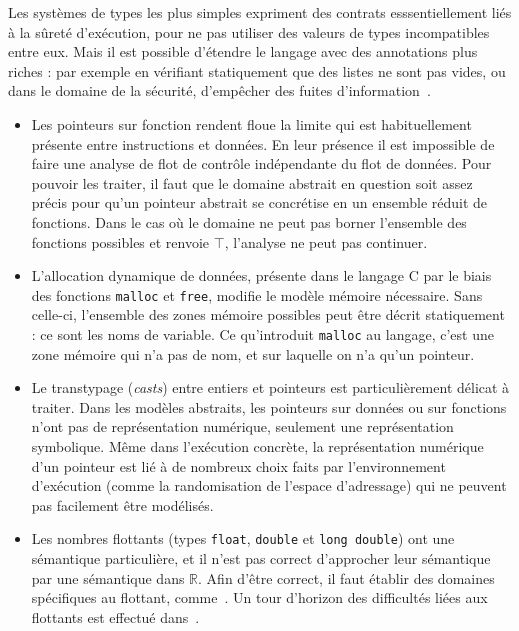 

Les systèmes de types les plus simples expriment des
contrats esssentiellement liés à la sûreté d'exécution, pour ne pas utiliser des
valeurs de types incompatibles entre eux. Mais il est possible d'étendre le
langage avec des annotations plus riches : par exemple en vérifiant statiquement
que des listes ne sont pas vides\cite{lightweight-static-capabilities}, ou dans
le domaine de la sécurité, d'empêcher des fuites d'information~\cite{LZ06a}.



\begin{itemize}
\item
Les pointeurs sur fonction rendent floue la limite qui est habituellement
présente entre instructions et données. En leur présence il est impossible de
faire une analyse de flot de contrôle indépendante du flot de données. Pour
pouvoir les traiter, il faut que le domaine abstrait en question soit assez
précis pour qu'un pointeur abstrait se concrétise en un ensemble réduit de
fonctions. Dans le cas où le domaine ne peut pas borner l'ensemble des fonctions
possibles et renvoie $\top$, l'analyse ne peut pas continuer.

\item
L'allocation dynamique de données, présente dans le langage C par le biais des
fonctions \texttt{malloc} et \texttt{free}, modifie le modèle mémoire
nécessaire. Sans celle-ci, l'ensemble des zones mémoire possibles peut être
décrit statiquement : ce sont les noms de variable. Ce qu'introduit
\texttt{malloc} au langage, c'est une zone mémoire qui n'a pas de nom, et sur
laquelle on n'a qu'un pointeur.


\item
Le transtypage (\emph{casts}) entre entiers et pointeurs est particulièrement
délicat à traiter. Dans les modèles abstraits, les pointeurs sur données ou sur
fonctions n'ont pas de représentation numérique, seulement une représentation
symbolique. Même dans l'exécution concrète, la représentation numérique d'un
pointeur est lié à de nombreux choix faits par l'environnement d'exécution
(comme la randomisation de l'espace d'adressage) qui ne peuvent pas facilement
être modélisés.

\item
Les nombres flottants (types \texttt{float}, \texttt{double} et \texttt{long
double}) ont une sémantique particulière, et il n'est pas correct d'approcher
leur sémantique par une sémantique dans $ℝ$. Afin d'être correct, il faut
établir des domaines spécifiques au flottant, comme~\cite{floatpoly}. Un tour
d'horizon des difficultés liées aux flottants est effectué
dans~\cite{floatpitfalls}.

\end{itemize}

